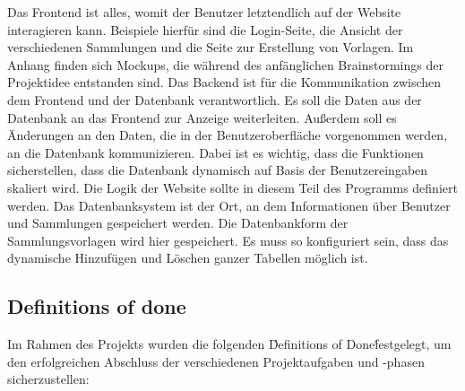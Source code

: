 Das Frontend ist alles, womit der Benutzer letztendlich auf der Website interagieren kann.
Beispiele hierfür sind die Login-Seite, die Ansicht der verschiedenen Sammlungen und die Seite zur Erstellung von Vorlagen.
Im Anhang finden sich Mockups, die während des anfänglichen Brainstormings der Projektidee entstanden sind.
Das Backend ist für die Kommunikation zwischen dem Frontend und der Datenbank verantwortlich.
Es soll die Daten aus der Datenbank an das Frontend zur Anzeige weiterleiten.
Außerdem soll es Änderungen an den Daten, die in der Benutzeroberfläche vorgenommen werden, an die Datenbank kommunizieren.
Dabei ist es wichtig, dass die Funktionen sicherstellen, dass die Datenbank dynamisch auf Basis der Benutzereingaben skaliert wird.
Die Logik der Website sollte in diesem Teil des Programms definiert werden.
Das Datenbanksystem ist der Ort, an dem Informationen über Benutzer und Sammlungen gespeichert werden.
Die Datenbankform der Sammlungsvorlagen wird hier gespeichert.
Es muss so konfiguriert sein, dass das dynamische Hinzufügen und Löschen ganzer Tabellen möglich ist.

\subsection{Definitions of done}\label{subsec:DoD}
Im Rahmen des Projekts wurden die folgenden \'Definitions of Done\' festgelegt, um den erfolgreichen Abschluss der verschiedenen Projektaufgaben und -phasen sicherzustellen:

